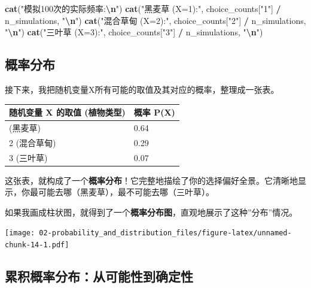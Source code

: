 \documentclass[
  twoside]{book}
\newenvironment{Shaded}{\begin{snugshade}}{\end{snugshade}}
\newcommand{\FunctionTok}[1]{\textcolor[rgb]{0.13,0.29,0.53}{\textbf{#1}}}
\newcommand{\NormalTok}[1]{#1}
\newcommand{\SpecialCharTok}[1]{\textcolor[rgb]{0.81,0.36,0.00}{\textbf{#1}}}
\newcommand{\StringTok}[1]{\textcolor[rgb]{0.31,0.60,0.02}{#1}}
\begin{document}
\begin{Shaded}
\begin{Highlighting}[]
\FunctionTok{cat}\NormalTok{(}\StringTok{"模拟100次的实际频率:}\SpecialCharTok{\textbackslash{}n}\StringTok{"}\NormalTok{)}
\FunctionTok{cat}\NormalTok{(}\StringTok{"黑麦草 (X=1):"}\NormalTok{, choice\_counts[}\StringTok{"1"}\NormalTok{] }\SpecialCharTok{/}\NormalTok{ n\_simulations, }\StringTok{"}\SpecialCharTok{\textbackslash{}n}\StringTok{"}\NormalTok{)}
\FunctionTok{cat}\NormalTok{(}\StringTok{"混合草甸 (X=2):"}\NormalTok{, choice\_counts[}\StringTok{"2"}\NormalTok{] }\SpecialCharTok{/}\NormalTok{ n\_simulations, }\StringTok{"}\SpecialCharTok{\textbackslash{}n}\StringTok{"}\NormalTok{)}
\FunctionTok{cat}\NormalTok{(}\StringTok{"三叶草 (X=3):"}\NormalTok{, choice\_counts[}\StringTok{"3"}\NormalTok{] }\SpecialCharTok{/}\NormalTok{ n\_simulations, }\StringTok{"}\SpecialCharTok{\textbackslash{}n}\StringTok{"}\NormalTok{)}
\end{Highlighting}
\end{Shaded}

\hypertarget{ux6982ux7387ux5206ux5e03}{%
\subsection{概率分布}\label{ux6982ux7387ux5206ux5e03}}

接下来，我把随机变量X所有可能的取值及其对应的概率，整理成一张表。

\begin{longtable}[]{@{}ll@{}}
\toprule\noalign{}
随机变量 X 的取值 (植物类型) & 概率 P(X) \\
\midrule\noalign{}
\endhead
\bottomrule\noalign{}
\endlastfoot
1 (黑麦草) & 0.64 \\
2 (混合草甸) & 0.29 \\
3 (三叶草) & 0.07 \\
\end{longtable}

这张表，就构成了一个\textbf{概率分布}！它完整地描绘了你的选择偏好全景。它清晰地显示，你最可能去哪（黑麦草），最不可能去哪（三叶草）。

如果我画成柱状图，就得到了一个\textbf{概率分布图}，直观地展示了这种''分布''情况。

\texttt{[image: 02-probability\_and\_distribution\_files/figure-latex/unnamed-chunk-14-1.pdf]}

\hypertarget{ux7d2fux79efux6982ux7387ux5206ux5e03ux4eceux53efux80fdux6027ux5230ux786eux5b9aux6027}{%
\subsection{累积概率分布：从可能性到确定性}\label{ux7d2fux79efux6982ux7387ux5206ux5e03ux4eceux53efux80fdux6027ux5230ux786eux5b9aux6027}}
\end{document}
